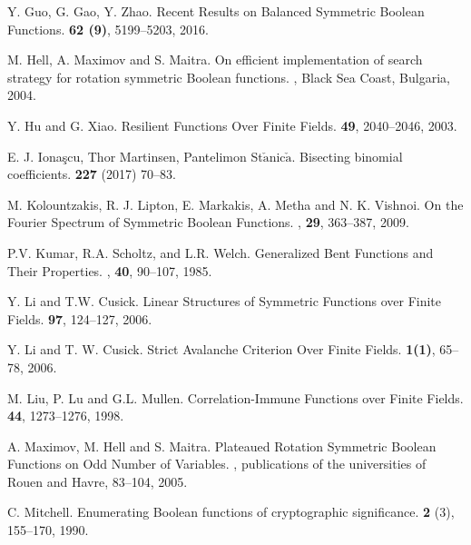 \begin{thebibliography}{1}
 Y. Guo, G. Gao, Y. Zhao.
\newblock Recent Results on Balanced Symmetric Boolean Functions.
 {\bf 62 (9)}, 5199--5203, 2016.

 M. Hell, A. Maximov and S. Maitra. 
\newblock On efficient implementation of search strategy for rotation symmetric Boolean functions. 
, Black Sea Coast, Bulgaria,
2004.

 Y. Hu and G. Xiao.
\newblock Resilient Functions Over Finite Fields.
 {\bf 49},  2040--2046, 2003.

 E. J. Iona\c{s}cu, Thor Martinsen, Pantelimon St$\check{\mbox{a}}$nic$\check{\mbox{a}}$.
\newblock Bisecting binomial coefficients.
 {\bf 227} (2017) 70--83.

 M. Kolountzakis, R. J. Lipton, E. Markakis, A. Metha and N. K. Vishnoi. 
\newblock On the Fourier Spectrum of Symmetric Boolean Functions.
, {\bf  29}, 363--387, 2009.

 P.V. Kumar, R.A. Scholtz, and L.R. Welch. 
\newblock Generalized Bent Functions and Their Properties.
, {\bf 40}, 90--107, 1985.

 Y. Li and T.W. Cusick. 
\newblock Linear Structures of Symmetric Functions over Finite Fields.
 {\bf 97}, 124--127, 2006.

 Y. Li and T. W. Cusick. 
\newblock Strict Avalanche Criterion Over Finite Fields.
  {\bf 1(1)}, 65--78, 2006.

M. Liu, P. Lu and G.L. Mullen. 
\newblock Correlation-Immune Functions over Finite Fields.
 {\bf 44}, 1273--1276, 1998.

 A. Maximov, M. Hell and S. Maitra. 
\newblock Plateaued Rotation Symmetric Boolean Functions on Odd Number of Variables. 
, publications of the universities of Rouen and Havre, 83--104, 2005.

  C. Mitchell.
\newblock Enumerating Boolean functions of cryptographic significance.
 {\bf 2} (3), 155--170, 1990.


\end{thebibliography}
